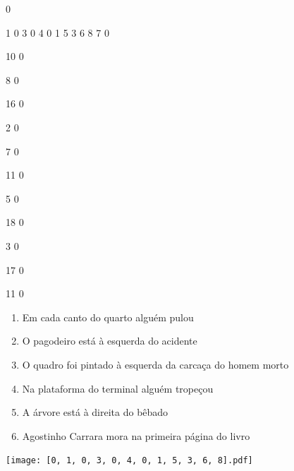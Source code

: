\documentclass[12pt]{article}
\begin{document}
		\vfill  
		  
{
	0	%

	1	%
	0	%
	3	%
	0	%
	4	%
	0	%
	1	%
	5	%
	3	%
	6	%
	8	%
	7	%
	0	%

	10	%
	0	%

	8	%
	0	%

	16	%
	0	%

	2	%
	0	%

	7	%
	0	%

	11	%
	0	%

	5	%
	0	%

	18	%
	0	%

	3	%
	0	%

	17	%
	0	%

	11	%
	0	%

}	  
		    	

		 

\pagebreak


	\begin{enumerate}
		  \sffamily %
		  \large %


\vfill \item
Em cada canto do quarto	%
alguém pulou	%

\vfill \item
O pagodeiro está	%
à esquerda
do acidente	%

\vfill \item
O quadro foi pintado	%
à esquerda
da carcaça do homem morto	%

\vfill \item
Na plataforma do terminal	%
alguém tropeçou	%

\vfill \item
A árvore está	%
à direita
do bêbado	%

\vfill \item
Agostinho Carrara mora	%
na primeira página do livro	%
	\end{enumerate}
		  
		  \hfill

		  \vfill

\texttt{[image: [0, 1, 0, 3, 0, 4, 0, 1, 5, 3, 6, 8].pdf]}


	\hfill	  	  
\end{document}
